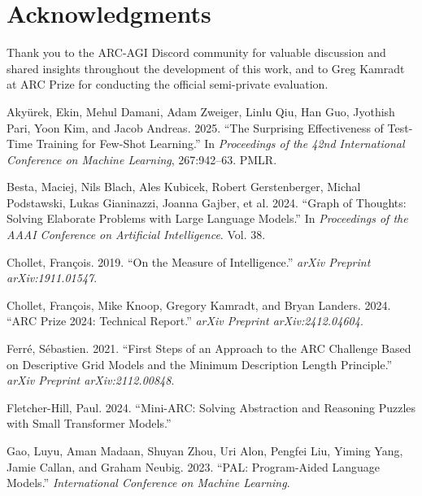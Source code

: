 \documentclass[11pt]{article}
\newlength{\cslhangindent}
\newenvironment{CSLReferences}[2] %
  {\setlength{\parindent}{0pt}%
   \setlength{\parskip}{#2\baselineskip}%
   \ifodd #1\relax
     \setlength{\leftskip}{\cslhangindent}%
     \setlength{\parindent}{-\cslhangindent}%
   \fi}
  {}
\begin{document}
\hypertarget{acknowledgments}{%
\section{Acknowledgments}\label{acknowledgments}}

Thank you to the ARC-AGI Discord community for valuable discussion and
shared insights throughout the development of this work, and to Greg
Kamradt at ARC Prize for conducting the official semi-private
evaluation.

\hypertarget{refs}{}
\begin{CSLReferences}{1}{0}
\leavevmode{}%
Akyürek, Ekin, Mehul Damani, Adam Zweiger, Linlu Qiu, Han Guo, Jyothish
Pari, Yoon Kim, and Jacob Andreas. 2025. {``The Surprising Effectiveness
of Test-Time Training for Few-Shot Learning.''} In \emph{Proceedings of
the 42nd International Conference on Machine Learning}, 267:942--63.
PMLR.

\leavevmode{}%
Besta, Maciej, Nils Blach, Ales Kubicek, Robert Gerstenberger, Michal
Podstawski, Lukas Gianinazzi, Joanna Gajber, et al. 2024. {``Graph of
Thoughts: Solving Elaborate Problems with Large Language Models.''} In
\emph{Proceedings of the AAAI Conference on Artificial Intelligence}.
Vol. 38.

\leavevmode{}%
Chollet, François. 2019. {``On the Measure of Intelligence.''}
\emph{arXiv Preprint arXiv:1911.01547}.

\leavevmode{}%
Chollet, François, Mike Knoop, Gregory Kamradt, and Bryan Landers. 2024.
{``{ARC Prize 2024}: Technical Report.''} \emph{arXiv Preprint
arXiv:2412.04604}.

\leavevmode{}%
Ferré, Sébastien. 2021. {``First Steps of an Approach to the {ARC}
Challenge Based on Descriptive Grid Models and the Minimum Description
Length Principle.''} \emph{arXiv Preprint arXiv:2112.00848}.

\leavevmode{}%
Fletcher-Hill, Paul. 2024. {``Mini-{ARC}: Solving Abstraction and
Reasoning Puzzles with Small Transformer Models.''}

\leavevmode{}%
Gao, Luyu, Aman Madaan, Shuyan Zhou, Uri Alon, Pengfei Liu, Yiming Yang,
Jamie Callan, and Graham Neubig. 2023. {``{PAL}: Program-Aided Language
Models.''} \emph{International Conference on Machine Learning}.


\end{CSLReferences}
\end{document}

